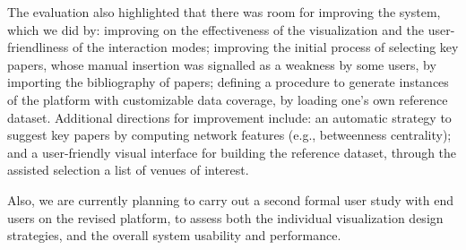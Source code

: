 The evaluation also highlighted that there was room for improving the system, which we did by: improving on the effectiveness of the visualization and the user-friendliness of the interaction modes; improving the initial process of selecting key papers, whose manual insertion was signalled as a weakness by some users, by importing the bibliography of papers; defining a procedure to generate instances of the platform with customizable data coverage, by loading one's own reference dataset. Additional directions for improvement include: an automatic strategy to suggest key papers by computing network features (e.g., betweenness  centrality); and a user-friendly visual interface for building the reference dataset, through the assisted selection a list of venues of interest.   

Also, we are currently planning to carry out a second formal user study with end users on the revised platform, to assess both the individual visualization design strategies, and the overall system usability and performance.


